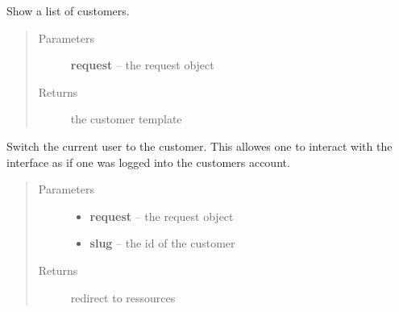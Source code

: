 \documentclass[letterpaper,10pt,english]{sphinxmanual}
\begin{document}

\begin{fulllineitems}
\label{api/system:limeade.system.views.customer_list}
Show a list of customers.
\begin{quote}\begin{description}
\item[{Parameters}] \leavevmode
\textbf{request} -- the request object

\item[{Returns}] \leavevmode
the customer template

\end{description}\end{quote}

\end{fulllineitems}


\begin{fulllineitems}
\label{api/system:limeade.system.views.customer_manage}
Switch the current user to the customer. This allowes one to interact with 
the interface as if one was logged into the customers account.
\begin{quote}\begin{description}
\item[{Parameters}] \leavevmode\begin{itemize}
\item {} 
\textbf{request} -- the request object

\item {} 
\textbf{slug} -- the id of the customer

\end{itemize}

\item[{Returns}] \leavevmode
redirect to ressources

\end{description}\end{quote}

\end{fulllineitems}

\end{document}
